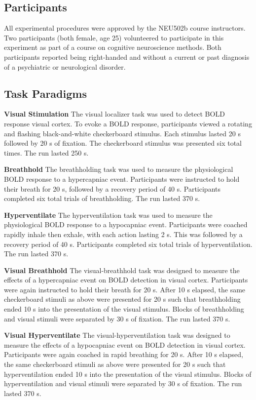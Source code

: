 \documentclass[9pt]{NEU502b-fmri}
\begin{document}
\subsection{Participants}
All experimental procedures were approved by the NEU502b course instructors. Two participants (both female, age 25) volunteered to participate in this experiment as part of a course on cognitive neuroscience methods. Both participants reported being right-handed and without a current or past diagnosis of a psychiatric or neurological disorder.

\subsection{Task Paradigms}
\textbf{Visual Stimulation} The visual localizer task was used to detect BOLD response visual cortex. To evoke a BOLD response, participants viewed a rotating and flashing black-and-white checkerboard stimulus. Each stimulus lasted 20 s followed by 20 s of fixation. The checkerboard stimulus was presented six total times. The run lasted 250 s.

\textbf{Breathhold} The breathholding task was used to measure the physiological BOLD response to a hypercapniac event. Participants were instructed to hold their breath for 20 s, followed by a recovery period of 40 s. Participants completed six total trials of breathholding. The run lasted 370 s.

\textbf{Hyperventilate} The hyperventilation task was used to measure the physiological BOLD response to a hypocapniac event. Participants were coached rapidly inhale then exhale, with each action lasting 2 s. This was followed by a recovery period of 40 s. Participants completed six total trials of hyperventilation. The run lasted 370 s.

\textbf{Visual Breathhold} The visual-breathhold task was designed to measure the effects of a hypercapniac event on BOLD detection in visual cortex. Participants were again instructed to hold their breath for 20 s. After 10 s elapsed, the same checkerboard stimuli as above were presented for 20 s such that breathholding ended 10 s into the presentation of the visual stimulus. Blocks of breathholding and visual stimuli were separated by 30 s of fixation. The run lasted 370 s.

\textbf{Visual Hyperventilate} The visual-hyperventilation task was designed to measure the effects of a hypocapniac event on BOLD detection in visual cortex. Participants were again coached in rapid breathing for 20 s. After 10 s elapsed, the same checkerboard stimuli as above were presented for 20 s such that hyperventilation ended 10 s into the presentation of the visual stimulus. Blocks of hyperventilation and visual stimuli were separated by 30 s of fixation. The run lasted 370 s.
\end{document}
